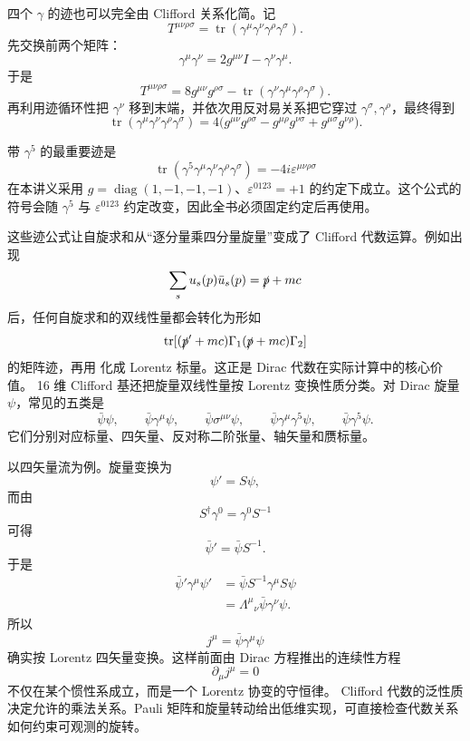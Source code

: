 四个 $\gamma$ 的迹也可以完全由 Clifford 关系化简。记
\[
T^{\mu\nu\rho\sigma}
=\operatorname{tr}(\gamma^\mu\gamma^\nu\gamma^\rho\gamma^\sigma).
\]
先交换前两个矩阵：
\[
\gamma^\mu\gamma^\nu
=2g^{\mu\nu}I-\gamma^\nu\gamma^\mu.
\]
于是
\[
T^{\mu\nu\rho\sigma}
=8g^{\mu\nu}g^{\rho\sigma}
-\operatorname{tr}(\gamma^\nu\gamma^\mu\gamma^\rho\gamma^\sigma).
\]
再利用迹循环性把 $\gamma^\nu$ 移到末端，并依次用反对易关系把它穿过 $\gamma^\sigma,\gamma^\rho$，最终得到
\begin{equation}
{
\operatorname{tr}(\gamma^\mu\gamma^\nu\gamma^\rho\gamma^\sigma)
=4\bigl(
 g^{\mu\nu}g^{\rho\sigma}
-g^{\mu\rho}g^{\nu\sigma}
+g^{\mu\sigma}g^{\nu\rho}
\bigr)
}.
\label{eq:gamma-trace-four}
\end{equation}

带 $\gamma^5$ 的最重要迹是
\begin{equation*}{
\operatorname{tr}(\gamma^5\gamma^\mu\gamma^\nu\gamma^\rho\gamma^\sigma)
=-4i\varepsilon^{\mu\nu\rho\sigma}
}\end{equation*}
在本讲义采用 $g=\operatorname{diag}(1,-1,-1,-1)$、$\varepsilon^{0123}=+1$ 的约定下成立。这个公式的符号会随 $\gamma^5$ 与 $\varepsilon^{0123}$ 约定改变，因此全书必须固定约定后再使用。

这些迹公式让自旋求和从“逐分量乘四分量旋量”变成了 Clifford 代数运算。例如出现
\[
\sum_su_s(p)\bar u_s(p)=\slashed p+mc
\]
后，任何自旋求和的双线性量都会转化为形如
\[
\operatorname{tr}
[(\slashed p'+mc)\Gamma_1(\slashed p+mc)\Gamma_2]
\]
的矩阵迹，再用  化成 Lorentz 标量。这正是 Dirac 代数在实际计算中的核心价值。
16 维 Clifford 基还把旋量双线性量按 Lorentz 变换性质分类。对 Dirac 旋量 $\psi$，常见的五类是
\[
\bar\psi\psi,
\qquad
\bar\psi\gamma^\mu\psi,
\qquad
\bar\psi\sigma^{\mu\nu}\psi,
\qquad
\bar\psi\gamma^\mu\gamma^5\psi,
\qquad
\bar\psi\gamma^5\psi.
\]
它们分别对应标量、四矢量、反对称二阶张量、轴矢量和赝标量。

以四矢量流为例。旋量变换为
\[
\psi' =S\psi,
\]
而由
\[
S^\dagger\gamma^0=\gamma^0S^{-1}
\]
可得
\[
\bar\psi'=\bar\psi S^{-1}.
\]
于是
\[
\begin{aligned}
\bar\psi'\gamma^\mu\psi'
&=\bar\psi S^{-1}\gamma^\mu S\psi\\
&=\Lambda^\mu{}_{\nu}\bar\psi\gamma^\nu\psi.
\end{aligned}
\]
所以
\[
j^\mu=\bar\psi\gamma^\mu\psi
\]
确实按 Lorentz 四矢量变换。这样前面由 Dirac 方程推出的连续性方程
\[
\partial_\mu j^\mu=0
\]
不仅在某个惯性系成立，而是一个 Lorentz 协变的守恒律。
Clifford 代数的泛性质决定允许的乘法关系。Pauli 矩阵和旋量转动给出低维实现，可直接检查代数关系如何约束可观测的旋转。




